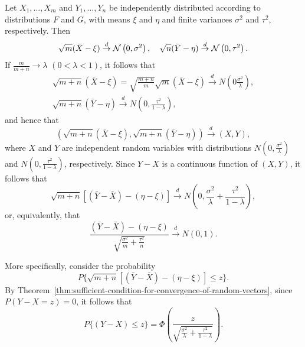 \begin{example}[Multinomial]

\end{example}

\begin{example}
	Let \(X_{1},\ldots,X_m\) and \(Y_{1},\ldots,Y_n\) be independently distributed according to distributions \(F\) and \(G\), with means \(\xi\) and \(\eta\) and finite variances \(\sigma^2\) and \(\tau^2\), respectively. Then
	\begin{equation*}
		\sqrt{m}(\bar{X}-\xi)\stackrel{d}{\rightarrow}\mathcal{N}\left(0,\sigma^2\right),\quad\sqrt{n}(\bar{Y}-\eta)\stackrel{d}{\rightarrow}\mathcal{N}\left(0,\tau^2\right).
	\end{equation*}
	If \(\frac{m}{m+n} \rightarrow \lambda\) \((0<\lambda<1)\), it follows that
	\begin{gather*}
		\sqrt{m+n}(\bar{X}-\xi)=\sqrt{\frac{m+n}{m}}\sqrt{m}(\bar{X}-\xi)\stackrel{d}{\rightarrow}N\left(0\frac{\sigma^2}{\lambda}\right),\\
		\sqrt{m+n}(\bar{Y}-\eta)\stackrel{d}{\rightarrow}N\left(0,\frac{\tau^2}{1-\lambda}\right),
	\end{gather*}
	and hence that
	\begin{equation*}
		(\sqrt{m+n}(\bar{X}-\xi),\sqrt{m+n}(\bar{Y}-\eta)) \stackrel{d}{\rightarrow}(X,Y),
	\end{equation*}
	where \(X\) and \(Y\) are independent random variables with distributions \(N\left(0, \frac{\sigma^2}{\lambda}\right)\) and \(N\left(0, \frac{\tau^2}{1-\lambda}\right)\), respectively.
	Since \(Y-X\) is a continuous function of \((X, Y)\), it follows that
	\begin{equation*}
		\sqrt{m+n}[(\bar{Y}-\bar{X})-(\eta-\xi)]\stackrel{d}{\rightarrow}N\left(0,\frac{\sigma^2}{\lambda}+\frac{\tau^2}{1-\lambda}\right),
	\end{equation*}
	or, equivalently, that
	\begin{equation*}
		\frac{(\bar{Y}-\bar{X})-(\eta-\xi)}{\sqrt{\frac{\sigma^2}{m}+\frac{\tau^2}{n}}}\stackrel{d}{\rightarrow}N(0,1).
	\end{equation*}

	More specifically, consider the probability
	\begin{equation*}
		P\{\sqrt{m+n}[(\bar{Y}-\bar{X})-(\eta-\xi)]\leq z\}.
	\end{equation*}
	By Theorem~\ref{thm:sufficient-condition-for-convergence-of-random-vectors}, since \(P(Y-X=z)=0\), it follows that
	\begin{equation*}
		P\{(Y-X) \leq z\}=\Phi\left(\frac{z}{\sqrt{\frac{\sigma^2}{\lambda}+\frac{\tau^2}{1-\lambda}}}\right).
	\end{equation*}
\end{example}

